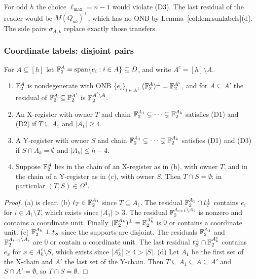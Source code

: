 \begin{remark}\label{col:rem:sunflower}
For odd $h$ the choice $\ell_{\max}=n-1$ would violate (D3). The last residual of the reader would be
$M(Q_{ab})^\perp$, which has no ONB by Lemma~\ref{col:lem:sunlabels}(d). The side pairs
$\sigma_{A,k}$ replace exactly those transfers.
\end{remark}

\subsubsection*{Coordinate labels: disjoint pairs}

For $A\subseteq[h]$ let $\mathbb{F}_2^A=\mathrm{span}\{e_i:i\in A\}\subseteq D$, and write $A^c=[h]\setminus A$.

\begin{lemma}\label{col:lem:coord}
\begin{enumerate}
\item[(a)] $\mathbb{F}_2^A$ is nondegenerate with ONB $\{e_i\}_{i\in A}$, $(\mathbb{F}_2^A)^\perp=\mathbb{F}_2^{A^c}$, and for $A\subseteq A'$
  the residual of $\mathbb{F}_2^A\subseteq\mathbb{F}_2^{A'}$ is $\mathbb{F}_2^{A'\setminus A}$.
\item[(b)] An X-register with owner $T$ and chain $\mathbb{F}_2^{A_1}\subsetneq\dots\subsetneq\mathbb{F}_2^{A_k}$ satisfies (D1)
  and (D2) if $T\subseteq A_1$ and $|A_1|\ge4$.
\item[(c)] A Y-register with owner $S$ and chain $\mathbb{F}_2^{A_1}\subsetneq\dots\subsetneq\mathbb{F}_2^{A_k}$ satisfies (D1)
  and (D3) if $S\cap A_k=\emptyset$ and $|A_k|\le h-4$.
\item[(d)] Suppose $\mathbb{F}_2^{A}$ lies in the chain of an X-register as in (b), with owner $T$, and in the chain
  of a Y-register as in (c), with owner $S$. Then $T\cap S=\emptyset$; in particular $(T,S)\in\Omega^0$.
\end{enumerate}
\end{lemma}

\begin{proof}
(a) is clear.
(b) $t_T\in\mathbb{F}_2^{A_1}$ since $T\subseteq A_1$. The residual $\mathbb{F}_2^{A_1}\cap t_T^\perp$ contains $e_i$ for
$i\in A_1\setminus T$, which exists since $|A_1|>3$. The residual $\mathbb{F}_2^{A_{i+1}\setminus A_i}$ is
nonzero and contains a coordinate unit. Finally $(\mathbb{F}_2^{A_k})^\perp=\mathbb{F}_2^{A_k^c}$ is $0$ or contains a
coordinate unit.
(c) $\mathbb{F}_2^{A_k}\perp t_S$ since the supports are disjoint. The residuals $\mathbb{F}_2^{A_1}$ and
$\mathbb{F}_2^{A_{i+1}\setminus A_i}$ are $0$ or contain a coordinate unit. The last residual
$t_S^\perp\cap\mathbb{F}_2^{A_k^c}$ contains $e_x$ for $x\in A_k^c\setminus S$, which exists since $|A_k^c|\ge4>|S|$.
(d) Let $A_1$ be the first set of the X-chain and $A'$ the last set of the Y-chain. Then
$T\subseteq A_1\subseteq A\subseteq A'$ and $S\cap A'=\emptyset$, so $T\cap S=\emptyset$.
\end{proof}


